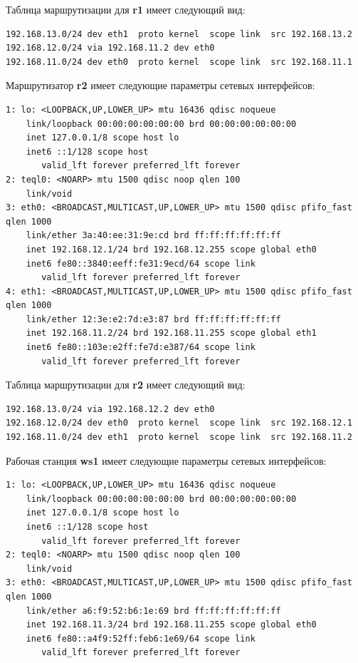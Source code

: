 \documentclass[a4paper,12pt]{article}
\begin{document}
Таблица маршрутизации для \textbf{r1} имеет следующий вид:

\begin{Verbatim}
192.168.13.0/24 dev eth1  proto kernel  scope link  src 192.168.13.2 
192.168.12.0/24 via 192.168.11.2 dev eth0 
192.168.11.0/24 dev eth0  proto kernel  scope link  src 192.168.11.1
\end{Verbatim}

Маршрутизатор \textbf{r2} имеет следующие параметры сетевых интерфейсов:

\begin{Verbatim}
1: lo: <LOOPBACK,UP,LOWER_UP> mtu 16436 qdisc noqueue 
    link/loopback 00:00:00:00:00:00 brd 00:00:00:00:00:00
    inet 127.0.0.1/8 scope host lo
    inet6 ::1/128 scope host 
       valid_lft forever preferred_lft forever
2: teql0: <NOARP> mtu 1500 qdisc noop qlen 100
    link/void 
3: eth0: <BROADCAST,MULTICAST,UP,LOWER_UP> mtu 1500 qdisc pfifo_fast qlen 1000
    link/ether 3a:40:ee:31:9e:cd brd ff:ff:ff:ff:ff:ff
    inet 192.168.12.1/24 brd 192.168.12.255 scope global eth0
    inet6 fe80::3840:eeff:fe31:9ecd/64 scope link 
       valid_lft forever preferred_lft forever
4: eth1: <BROADCAST,MULTICAST,UP,LOWER_UP> mtu 1500 qdisc pfifo_fast qlen 1000
    link/ether 12:3e:e2:7d:e3:87 brd ff:ff:ff:ff:ff:ff
    inet 192.168.11.2/24 brd 192.168.11.255 scope global eth1
    inet6 fe80::103e:e2ff:fe7d:e387/64 scope link 
       valid_lft forever preferred_lft forever
\end{Verbatim}

Таблица маршрутизации для \textbf{r2} имеет следующий вид:

\begin{Verbatim}
192.168.13.0/24 via 192.168.12.2 dev eth0 
192.168.12.0/24 dev eth0  proto kernel  scope link  src 192.168.12.1 
192.168.11.0/24 dev eth1  proto kernel  scope link  src 192.168.11.2
\end{Verbatim}

Рабочая станция \textbf{ws1} имеет следующие параметры сетевых интерфейсов:

\begin{Verbatim}
1: lo: <LOOPBACK,UP,LOWER_UP> mtu 16436 qdisc noqueue 
    link/loopback 00:00:00:00:00:00 brd 00:00:00:00:00:00
    inet 127.0.0.1/8 scope host lo
    inet6 ::1/128 scope host 
       valid_lft forever preferred_lft forever
2: teql0: <NOARP> mtu 1500 qdisc noop qlen 100
    link/void 
3: eth0: <BROADCAST,MULTICAST,UP,LOWER_UP> mtu 1500 qdisc pfifo_fast qlen 1000
    link/ether a6:f9:52:b6:1e:69 brd ff:ff:ff:ff:ff:ff
    inet 192.168.11.3/24 brd 192.168.11.255 scope global eth0
    inet6 fe80::a4f9:52ff:feb6:1e69/64 scope link 
       valid_lft forever preferred_lft forever
\end{Verbatim}
\end{document}
